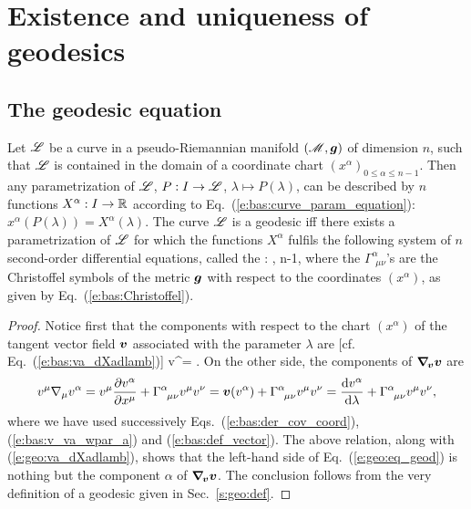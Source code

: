 
\section{Existence and uniqueness of geodesics}

\subsection{The geodesic equation} \label{s:geo:geodesic_eq}

\begin{greybox}
Let $\mathscr{L}$ be a curve in a pseudo-Riemannian
manifold $(\mathscr{M},\bm{g})$ of dimension $n$, such that
$\mathscr{L}$ is contained in the domain of a coordinate chart $(x^\alpha)_{0\leq\alpha\leq n-1}$.
Then any parametrization of $\mathscr{L}$, $P: I \to  \mathscr{L}$, $\lambda\mapsto P(\lambda)$,
can be described by $n$ functions $X^\alpha: I\to \mathbb{R}$
according to Eq.~(\ref{e:bas:curve_param_equation}): $x^\alpha(P(\lambda)) = X^\alpha(\lambda)$.
The curve $\mathscr{L}$ is a geodesic iff there exists a parametrization of $\mathscr{L}$
for which the functions $X^\alpha$ fulfils the following
system of $n$ second-order differential equations, called the
:
\be \label{e:geo:eq_geod}
    ,   \leq \alpha \leq n-1,
\ee
where the $\Gamma^\alpha_{\ \, \mu \nu}$'s are the Christoffel symbols of the metric $\bm{g}$
with respect to the coordinates $(x^\alpha)$, as given by Eq.~(\ref{e:bas:Christoffel}).
\end{greybox}
\begin{proof}
Notice first that the components with respect
to the chart $(x^\alpha)$ of the tangent
vector field $\bm{v}$ associated with the parameter $\lambda$ are [cf. Eq.~(\ref{e:bas:va_dXadlamb})]
\be \label{e:geo:va_dXadlamb}
    v^\alpha =  .
\ee
On the other side, the components of $\bm{\nabla}_{\!\bm{v}}\bm{v}$ are
\[
    v^\mu \nabla_\mu v^\alpha = v^\mu \frac{\partial v^\alpha}{\partial x^\mu} + \Gamma^\alpha_{\ \, \mu \nu} v^\mu v^\nu
    = \bm{v}(v^\alpha) + \Gamma^\alpha_{\ \, \mu \nu} v^\mu v^\nu
    = \frac{\mathrm{d} v^\alpha}{\mathrm{d} \lambda} + \Gamma^\alpha_{\ \, \mu \nu} v^\mu v^\nu ,
\]
where we have used
successively Eqs.~(\ref{e:bas:der_cov_coord}), (\ref{e:bas:v_va_wpar_a}) and
(\ref{e:bas:def_vector}). The above relation, along with (\ref{e:geo:va_dXadlamb}),
shows that the left-hand side of
Eq.~(\ref{e:geo:eq_geod}) is nothing but the component $\alpha$ of
$\bm{\nabla}_{\!\bm{v}}\bm{v}$. The conclusion follows from the very definition
of a geodesic given in Sec.~\ref{s:geo:def}.
\end{proof}


